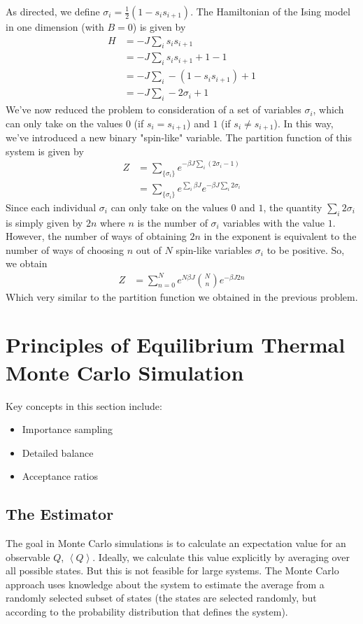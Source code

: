 \documentclass{article}
\begin{document}
\begin{itemize}
{As directed, we define $\sigma_{i} = \frac{1}{2}(1 - s_{i}s_{i+1})$. The Hamiltonian of the Ising
model in one dimension (with $B = 0$) is given by
$$
\begin{aligned}
H &= -J\sum_{i}s_{i}s_{i+1} \\
  &=  -J\sum_{i}s_{i}s_{i+1} + 1 - 1\\
  &= -J\sum_{i}-(1 - s_{i}s_{i+1}) + 1 \\
  &=  -J\sum_{i}-2\sigma_{i} + 1
\end{aligned}
$$
We've now reduced the problem to consideration of a set of variables $\sigma_{i}$, which
can only take on the values $0$ (if $s_{i} = s_{i+1}$) and $1$ (if $s_{i} \neq s_{i+1}$).
In this way, we've introduced a new binary "spin-like" variable. The partition function of this
system is given by
$$
\begin{aligned}
Z &= \sum_{\{\sigma_{i}\}}e^{-\beta J \sum_{i}(2\sigma_{i} - 1)} \\
&= \sum_{\{\sigma_{i}\}}e^{\sum_{i}\beta J}e^{-\beta J \sum_{i}2\sigma_{i}}
\end{aligned}
$$
Since each individual $\sigma_{i}$ can only take on the values $0$ and $1$, the quantity
$\sum_{i}2\sigma_{i}$ is simply given by $2n$ where $n$ is the number of $\sigma_{i}$ variables with
the value $1$. However, the number of ways of obtaining $2n$ in the exponent is equivalent
to the number of ways of choosing $n$ out of $N$ spin-like variables $\sigma_{i}$ to be positive. So,
we obtain
$$
\begin{aligned}
Z &= \sum_{n=0}^{N}e^{N\beta J}\binom{N}{n}e^{-\beta J 2n}
\end{aligned}
$$
Which very similar to the partition function we obtained in the previous problem.

}
\end{itemize}

\section{Principles of Equilibrium Thermal Monte Carlo Simulation}
Key concepts in this section include:
\begin{itemize}
\item Importance sampling
\item Detailed balance
\item Acceptance ratios
\end{itemize}

\subsection{The Estimator}
The goal in Monte Carlo simulations is to calculate an expectation value for an
observable $Q$, $\left \langle Q \right \rangle$. Ideally, we calculate this value
explicitly by averaging over all possible states. But this is not feasible for large
systems. The Monte Carlo approach uses knowledge about the system to estimate the
average from a randomly selected subset of states (the states are selected randomly,
but according to the probability distribution that defines the system).
\end{document}

